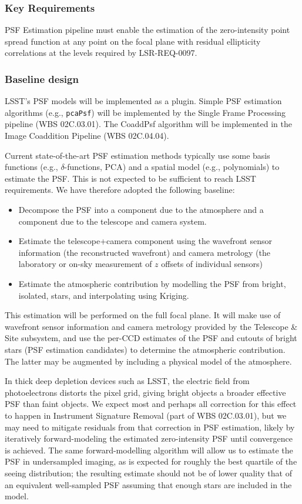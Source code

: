 \documentclass[12pt]{article}
\newcommand{\wbsSFM}{WBS 02C.03.01}
\newcommand{\wbsCoadd}{WBS 02C.04.04}
\begin{document}
\subsubsection{Key Requirements}

PSF Estimation pipeline must enable the estimation of the zero-intensity point spread function at any point on the focal plane with residual ellipticity correlations at the levels required by LSR-REQ-0097.

\subsubsection{Baseline design}

LSST's PSF models will be implemented as a plugin. Simple PSF estimation algorithms (e.g., {\tt pcaPsf}) will be implemented by the Single Frame Processing pipeline (\wbsSFM). The CoaddPsf algorithm will be implemented in the Image Coaddition Pipeline (\wbsCoadd).

Current state-of-the-art PSF estimation methods typically use some basis functions (e.g., $\delta$-functions, PCA) and a spatial model (e.g., polynomials) to estimate the PSF\@. This is not expected to be sufficient to reach LSST requirements. We have therefore adopted the following baseline:
\begin{itemize}
    \item Decompose the PSF into a component due to the atmosphere and a component due to the telescope and camera system.
    \item Estimate the telescope+camera component using the wavefront sensor information (the reconstructed wavefront) and camera metrology (the laboratory or on-sky measurement of $z$ offsets of individual sensors)
    \item Estimate the atmospheric contribution by modelling the PSF from bright, isolated, stars, and interpolating using Kriging. %
\end{itemize}

This estimation will be performed on the full focal plane. It will make use of wavefront sensor information and camera metrology provided by the Telescope \& Site subsystem, and use the per-CCD estimates of the PSF and cutouts of bright stars (PSF estimation candidates) to determine the atmospheric contribution. The latter may be augmented by including a physical model of the atmosphere.

In thick deep depletion devices such as LSST, the electric field from photoelectrons distorts the pixel grid, giving bright objects a broader effective PSF than faint objects.  We expect most and perhaps all correction for this effect to happen in Instrument Signature Removal (part of \wbsSFM), but we may need to mitigate residuals from that correction in PSF estimation, likely by iteratively forward-modeling the estimated zero-intensity PSF until convergence is achieved. The same forward-modelling algorithm will allow us to estimate the PSF in undersampled imaging, as is expected for roughly the best quartile of the seeing distribution; the resulting estimate should not be of lower quality that of an equivalent well-sampled PSF assuming that enough stars are included in the model.
\end{document}
